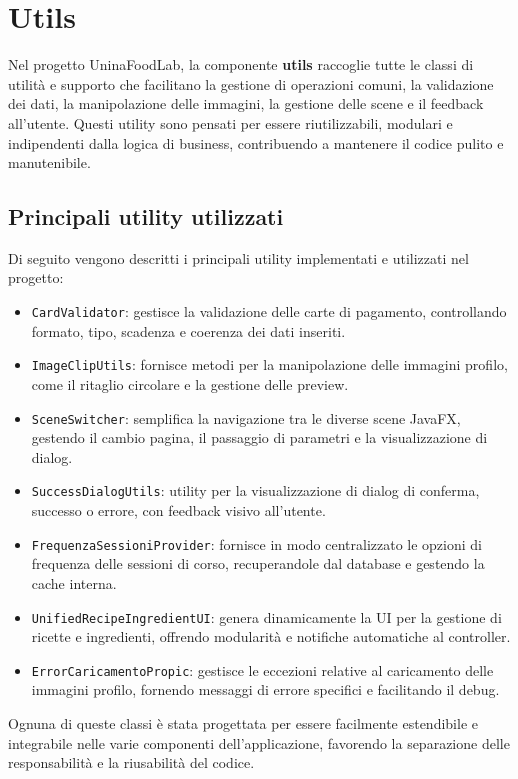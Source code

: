 \section{Utils}
Nel progetto UninaFoodLab, la componente \textbf{utils} raccoglie tutte le classi di utilità e supporto che facilitano la gestione di operazioni comuni, la validazione dei dati, la manipolazione delle immagini, la gestione delle scene e il feedback all'utente. Questi utility sono pensati per essere riutilizzabili, modulari e indipendenti dalla logica di business, contribuendo a mantenere il codice pulito e manutenibile.

\subsection{Principali utility utilizzati}
Di seguito vengono descritti i principali utility implementati e utilizzati nel progetto:
\begin{itemize}
    \item \texttt{CardValidator}: gestisce la validazione delle carte di pagamento, controllando formato, tipo, scadenza e coerenza dei dati inseriti.
    \item \texttt{ImageClipUtils}: fornisce metodi per la manipolazione delle immagini profilo, come il ritaglio circolare e la gestione delle preview.
    \item \texttt{SceneSwitcher}: semplifica la navigazione tra le diverse scene JavaFX, gestendo il cambio pagina, il passaggio di parametri e la visualizzazione di dialog.
    \item \texttt{SuccessDialogUtils}: utility per la visualizzazione di dialog di conferma, successo o errore, con feedback visivo all'utente.
    \item \texttt{FrequenzaSessioniProvider}: fornisce in modo centralizzato le opzioni di frequenza delle sessioni di corso, recuperandole dal database e gestendo la cache interna.
    \item \texttt{UnifiedRecipeIngredientUI}: genera dinamicamente la UI per la gestione di ricette e ingredienti, offrendo modularità e notifiche automatiche al controller.
    \item \texttt{ErrorCaricamentoPropic}: gestisce le eccezioni relative al caricamento delle immagini profilo, fornendo messaggi di errore specifici e facilitando il debug.
\end{itemize}
Ognuna di queste classi è stata progettata per essere facilmente estendibile e integrabile nelle varie componenti dell'applicazione, favorendo la separazione delle responsabilità e la riusabilità del codice.

